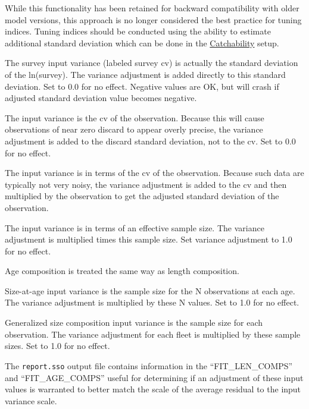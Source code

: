 While this functionality has been retained for backward compatibility with older model versions, this approach is no longer considered the best practice for tuning indices. Tuning indices should be conducted using the ability to estimate additional standard deviation which can be done in the \hyperlink{Qsetup}{Catchability} setup.   

The survey input variance (labeled survey \gls{cv}) is actually the standard deviation of the ln(survey). The variance adjustment is added directly to this standard deviation. Set to 0.0 for no effect. Negative values are OK, but will crash if adjusted standard deviation value becomes negative.

The input variance is the \gls{cv} of the observation. Because this will cause observations of near zero discard to appear overly precise, the variance adjustment is added to the discard standard deviation, not to the \gls{cv}. Set to 0.0 for no effect.

The input variance is in terms of the \gls{cv} of the observation. Because such data are typically not very noisy, the variance adjustment is added to the \gls{cv} and then multiplied by the observation to get the adjusted standard deviation of the observation.

The input variance is in terms of an effective sample size. The variance adjustment is multiplied times this sample size. Set variance adjustment to 1.0 for no effect.

Age composition is treated the same way as length composition.
	
Size-at-age input variance is the sample size for the N observations at each age. The variance adjustment is multiplied by these N values. Set to 1.0 for no effect.
	
Generalized size composition input variance is the sample size for each observation. The variance adjustment for each fleet is multiplied by these sample sizes. Set to 1.0 for no effect.
		
The \texttt{report.sso} output file contains information in the ``FIT\_LEN\_COMPS'' and ``FIT\_AGE\_COMPS''  useful for determining if an adjustment of these input values is warranted to better match the scale of the average residual to the input variance scale.
	
